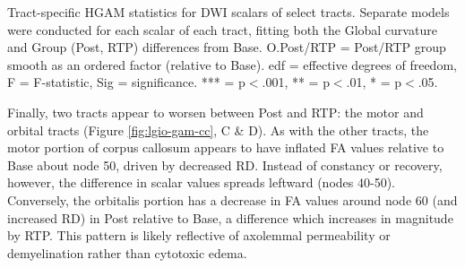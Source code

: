 \documentclass[12pt]{article}
\begin{document}
\begin{table}[H]
	\scriptsize
	
	\caption{Tract-specific HGAM statistics for DWI scalars of select tracts. Separate models were conducted for each scalar of each tract, fitting both the Global curvature and Group (Post, RTP) differences from Base. O.Post/RTP = Post/RTP group smooth as an ordered factor (relative to Base). edf = effective degrees of freedom, F = F-statistic, Sig = significance. *** = p$<$.001, ** = p$<$.01, * = p$<$.05.}
	\label{tbl:lgio-gam-cc}
\end{table}

Finally, two tracts appear to worsen between Post and RTP: the motor and orbital tracts (Figure \ref{fig:lgio-gam-cc}, C \& D). As with the other tracts, the motor portion of corpus callosum appears to have inflated FA values relative to Base about node 50, driven by decreased RD. Instead of constancy or recovery, however, the difference in scalar values spreads leftward (nodes 40-50). Conversely, the orbitalis portion has a decrease in FA values around node 60 (and increased RD) in Post relative to Base, a difference which increases in magnitude by RTP. This pattern is likely reflective of axolemmal permeability or demyelination rather than cytotoxic edema.
\end{document}
